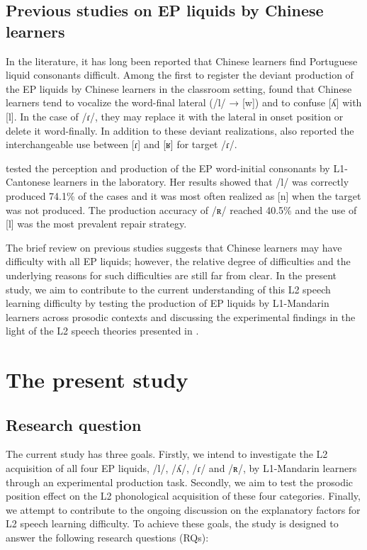 \documentclass[output=paper]{../langscibook}
\begin{document}
\subsection{Previous studies on EP liquids by Chinese learners}



In the literature, it has long been reported that Chinese learners find Portuguese liquid consonants difficult. Among the first to register the deviant production of the EP liquids by Chinese learners in the classroom setting, \citet{Batalha1995} found that Chinese learners tend to vocalize the word-final lateral (/l/ → [w]) and to confuse [ʎ] with [l]. In the case of /ɾ/, they may replace it with the lateral in onset position or delete it word-finally. In addition to these deviant realizations, \citet{Martins2008} also reported the interchangeable use between [ɾ] and [ʁ] for target /ɾ/.

\citet{Oliveira2016} tested the perception and production of the EP word-initial consonants by L1-Cantonese learners in the laboratory. Her results showed that /l/ was correctly produced 74.1\% of the cases and it was most often realized as [n] when the target was not produced. The production accuracy of /ʀ/ reached 40.5\% and the use of [l] was the most prevalent repair strategy.

The brief review on previous studies suggests that Chinese learners may have difficulty with all EP liquids; however, the relative degree of difficulties and the underlying reasons for such difficulties are still far from clear. In the present study, we aim to contribute to the current understanding of this L2 speech learning difficulty by testing the production of EP liquids by L1-Mandarin learners across prosodic contexts and discussing the experimental findings in the light of the L2 speech theories presented in .


\section{The present study}
\label{sec:zhou:4}
\subsection{Research question}



The current study has three goals. Firstly, we intend to investigate the L2 acquisition of all four EP liquids, /l/, /ʎ/, /ɾ/ and /ʀ/, by L1-Mandarin learners through an experimental production task. Secondly, we aim to test the prosodic position effect on the L2 phonological acquisition of these four categories. Finally, we attempt to contribute to the ongoing discussion on the explanatory factors for L2 speech learning difficulty. To achieve these goals, the study is designed to answer the following research questions (RQs):
\end{document}
